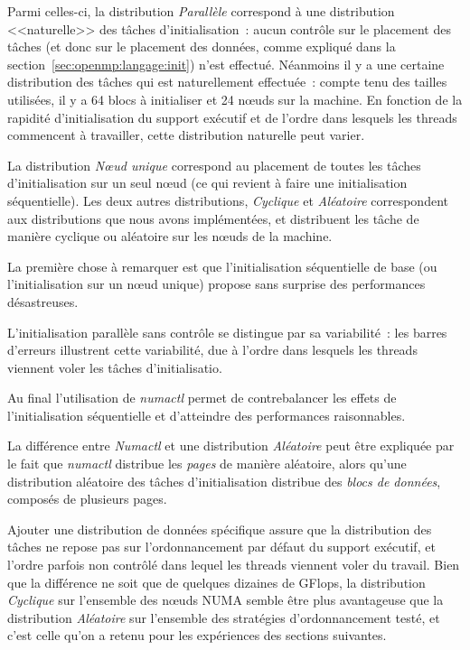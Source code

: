 Parmi celles-ci, la distribution \emph{Parallèle} correspond à une distribution <<naturelle>> des tâches d'initialisation~: aucun contrôle sur le placement des tâches (et donc sur le placement des données, comme expliqué dans la section~\ref{sec:openmp:langage:init}) n'est effectué.
Néanmoins il y a une certaine distribution des tâches qui est naturellement effectuée~: compte tenu des tailles utilisées, il y a 64 blocs à initialiser et 24 nœuds sur la machine. En fonction de la rapidité d'initialisation du support exécutif et de l'ordre dans lesquels les threads commencent à travailler, cette distribution naturelle peut varier.

La distribution \emph{Nœud unique} correspond au placement de toutes les tâches d'initialisation sur un seul nœud (ce qui revient à faire une initialisation séquentielle).
Les deux autres distributions, \emph{Cyclique} et \emph{Aléatoire} correspondent aux distributions que nous avons implémentées, et distribuent les tâche de manière cyclique ou aléatoire sur les nœuds de la machine.

La première chose à remarquer est que l'initialisation séquentielle de base (ou l'initialisation sur un nœud unique) propose sans surprise des performances désastreuses.

L'initialisation parallèle sans contrôle se distingue par sa variabilité~: les barres d'erreurs illustrent cette variabilité, due à l'ordre dans lesquels les threads viennent voler les tâches d'initialisatio.

Au final l'utilisation de \emph{numactl} permet de contrebalancer les effets de l'initialisation séquentielle et d'atteindre des performances raisonnables.

La différence entre \emph{Numactl} et une distribution \emph{Aléatoire} peut être expliquée par le fait que \emph{numactl} distribue les \emph{pages} de manière aléatoire, alors qu'une distribution aléatoire des tâches d'initialisation distribue des \emph{blocs de données}, composés de plusieurs pages.

Ajouter une distribution de données spécifique assure que la distribution des tâches ne repose pas sur l'ordonnancement par défaut du support exécutif, et l'ordre parfois non contrôlé dans lequel les threads viennent voler du travail.
Bien que la différence ne soit que de quelques dizaines de GFlops, la distribution \emph{Cyclique} sur l'ensemble des nœuds NUMA semble être plus avantageuse que la distribution \emph{Aléatoire} sur l'ensemble des stratégies d'ordonnancement testé, et c'est celle qu'on a retenu pour les expériences des sections suivantes.


